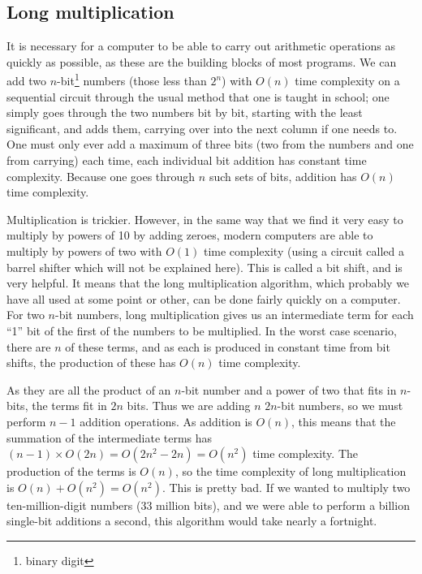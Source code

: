 \documentclass[10pt,a4paper]{article}
\begin{document}
\begin{multicols}{2}
	
	\section{Long multiplication}
	It is necessary for a computer to be able to carry out arithmetic operations as quickly as possible, as these are the building blocks of most programs. We can add two \(n\)-bit\footnote{binary digit} numbers (those less than \(2^n\)) with \(O(n)\) time complexity on a sequential circuit through the usual method that one is taught in school; one simply goes through the two numbers bit by bit, starting with the least significant, and adds them, carrying over into the next column if one needs to. One must only ever add a maximum of three bits (two from the numbers and one from carrying) each time, each individual bit addition has constant time complexity. Because one goes through \(n\) such sets of bits, addition has \(O(n)\) time complexity.
	
	Multiplication is trickier. However, in the same way that we find it very easy to multiply by powers of 10 by adding zeroes, modern computers are able to multiply by powers of two with \(O(1)\) time complexity (using a circuit called a barrel shifter which will not be explained here). This is called a bit shift, and is very helpful. It means that the long multiplication algorithm, which probably we have all used at some point or other, can be done fairly quickly on a computer. For two \(n\)-bit numbers, long multiplication gives us an intermediate term for each ``1'' bit of the first of the numbers to be multiplied. In the worst case scenario, there are \(n\) of these terms, and as each is produced in constant time from bit shifts, the production of these has \(O(n)\) time complexity.
	
	As they are all the product of an \(n\)-bit number and a power of two that fits in \(n\)-bits, the terms fit in \(2n\) bits. Thus we are adding \(n\) \(2n\)-bit numbers, so we must perform \(n-1\) addition operations. As addition is \(O(n)\), this means that the summation of the intermediate terms has \((n-1)\times{}O(2n)=O(2n^2-2n)=O(n^2)\) time complexity. The production of the terms is \(O(n)\), so the time complexity of long multiplication is \(O(n)+O(n^2)=O(n^2)\). This is pretty bad. If we wanted to multiply two ten-million-digit numbers (33 million bits), and we were able to perform a billion single-bit additions a second, this algorithm would take nearly a fortnight.
	

\end{multicols}
\end{document}
